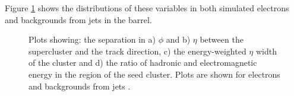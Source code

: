 Figure \ref{fig:electronID} shows the distributions of these variables in both simulated
electrons and backgrounds from jets in the barrel.

\begin{figure}
\begin{center}

\end{center}
\caption{
    Plots showing: the separation in a) $\phi$ and b) $\eta$ between the supercluster and the
    track direction, c) the energy-weighted $\eta$ width of the cluster and d)
    the ratio of hadronic and electromagnetic energy in the region of the seed
    cluster. Plots are shown for electrons and backgrounds from jets \cite{Baffioni:2006cd}. 
}
\label{fig:electronID}
\end{figure} 

